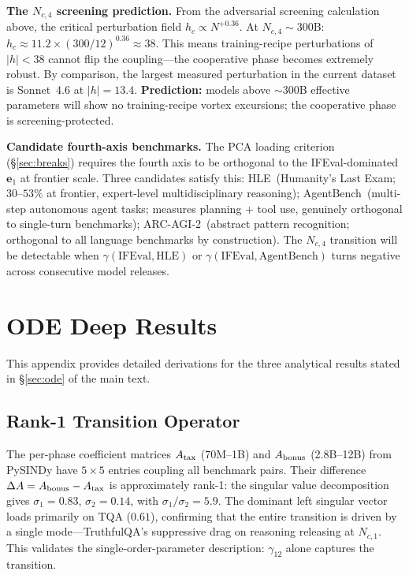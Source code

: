 \documentclass[11pt]{article}
\begin{document}
\textbf{The $N_{c,4}$ screening prediction.}
From the adversarial screening calculation above, the critical perturbation field $h_c \propto N^{+0.36}$.
At $N_{c,4} \sim 300$B: $h_c \approx 11.2 \times (300/12)^{0.36} \approx 38$.
This means training-recipe perturbations of $|h| < 38$ cannot flip the coupling---the cooperative phase becomes extremely robust.
By comparison, the largest measured perturbation in the current dataset is Sonnet~4.6 at $|h| = 13.4$.
\textbf{Prediction:} models above $\sim$300B effective parameters will show no training-recipe vortex excursions; the cooperative phase is screening-protected.

\textbf{Candidate fourth-axis benchmarks.}
The PCA loading criterion (\S\ref{sec:breaks}) requires the fourth axis to be orthogonal to the IFEval-dominated $\mathbf{e}_1$ at frontier scale.
Three candidates satisfy this:
HLE~(Humanity's Last Exam; $30$--$53\%$ at frontier, expert-level multidisciplinary reasoning);
AgentBench~(multi-step autonomous agent tasks; measures planning + tool use, genuinely orthogonal to single-turn benchmarks);
ARC-AGI-2~(abstract pattern recognition; orthogonal to all language benchmarks by construction).
The $N_{c,4}$ transition will be detectable when $\gamma(\text{IFEval}, \text{HLE})$ or $\gamma(\text{IFEval}, \text{AgentBench})$ turns negative across consecutive model releases.

\section{ODE Deep Results}
\label{app:ode}

This appendix provides detailed derivations for the three analytical results stated in \S\ref{sec:ode} of the main text.

\subsection{Rank-1 Transition Operator}

The per-phase coefficient matrices $A_{\rm tax}$ (70M--1B) and $A_{\rm bonus}$ (2.8B--12B) from PySINDy have $5{\times}5$ entries coupling all benchmark pairs.
Their difference $\Delta A = A_{\rm bonus} - A_{\rm tax}$ is approximately rank-1: the singular value decomposition gives $\sigma_1 = 0.83$, $\sigma_2 = 0.14$, with $\sigma_1/\sigma_2 = 5.9$.
The dominant left singular vector loads primarily on TQA ($0.61$), confirming that the entire transition is driven by a single mode---TruthfulQA's suppressive drag on reasoning releasing at $N_{c,1}$.
This validates the single-order-parameter description: $\gamma_{12}$ alone captures the transition.
\end{document}
